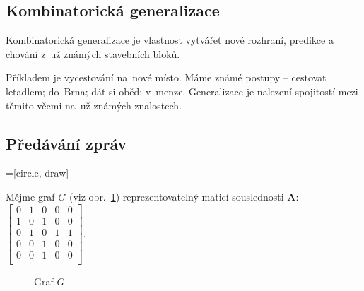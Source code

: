 \subsection{Kombinatorická generalizace}

Kombinatorická generalizace je vlastnost vytvářet nové rozhraní, predikce a chování z~už známých stavebních bloků.

Příkladem je vycestování na~nové místo.
Máme známé postupy -- cestovat letadlem; do~Brna; dát si oběd; v~menze.
Generalizace je nalezení spojitostí mezi těmito věcmi na~už známých znalostech.

\subsection{Předávání zpráv}
=[circle, draw]

Mějme graf $G$ (viz obr.~\ref{graf-pro-predavani-zprav}) reprezentovatelný maticí souslednosti $\mathbf{A}$: 
$\left[ \begin{matrix}
0 & 1 & 0 & 0 & 0 \\
1 & 0 & 1 & 0 & 0 \\
0 & 1 & 0 & 1 & 1 \\
0 & 0 & 1 & 0 & 0 \\
0 & 0 & 1 & 0 & 0 \\
\end{matrix} \right]$.

\begin{figure}[ht]
    \centering
    \caption{Graf $G$.}
    \label{graf-pro-predavani-zprav}
\end{figure}
\FloatBarrier

